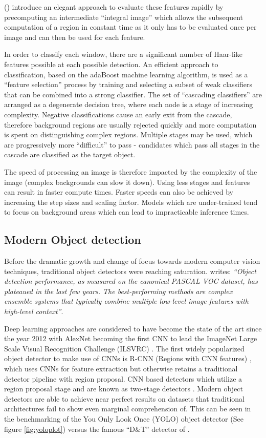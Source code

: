 \documentclass[a4paper,twoside,12pt]{report}
\begin{document}
\citeauthor{vjdet} (\citeyear{vjdet}) introduce an elegant approach to evaluate these features rapidly by precomputing an intermediate ``integral image'' which allows the subsequent computation of a region in constant time as it only has to be evaluated once per image and can then be used for each feature.

In order to classify each window, there are a significant number of Haar-like features possible at each possible detection. An efficient approach to classification, based on the adaBoost machine learning algorithm, is used as a ``feature selection'' process by training and selecting a subset of weak classifiers that can be combined into a strong classifier. The set of ``cascading classifiers'' are arranged as a degenerate decision tree, where each node is a stage of increasing complexity. Negative classifications cause an early exit from the cascade, therefore background regions are usually rejected quickly and more computation is spent on distinguishing complex regions.  Multiple stages may be used, which are progressively more ``difficult'' to pass - candidates which pass all stages in the
cascade are classified as the target object.

The speed of processing an image is therefore impacted by the complexity of the image (complex backgrounds can slow it down). Using less stages and features can result in faster compute times. Faster speeds can also be achieved by increasing the step sizes and scaling factor. Models which are under-trained tend to focus on background areas which can lead to impracticable inference times. 

\newpage
\subsection{Modern Object detection}

Before the dramatic growth and change of focus towards modern computer vision techniques, traditional object detectors were reaching saturation. \cite{rcnn} writes: \textit{``Object detection performance, as measured on the canonical PASCAL VOC dataset, has plateaued in the last few years. The best-performing methods are complex ensemble systems that typically combine multiple low-level image features with high-level context''}.

Deep learning approaches are considered to have become the state of the art since the year 2012 with AlexNet becoming the first CNN to lead the ImageNet Large Scale Visual Recognition Challenge (ILSVRC) \citep{alexnet}. The first widely popularized object detector to make use of CNNs is R-CNN (Regions with CNN features) \citep{rcnn}, which uses CNNs for feature extraction but otherwise retains a traditional detector pipeline with region proposal. CNN based detectors which utilize a region proposal stage and are known as two-stage detectors \citep{comprehensive}.  Modern object detectors are able to achieve near perfect results on datasets that traditional architectures fail to show even marginal comprehension of. This can be seen in the benchmarking of the You Only Look Once (YOLO) object detector (See figure \ref{fig:yoloplot}) \citep{yolo} versus the famous ``D\&T'' detector of \cite{hog}.
\end{document}
